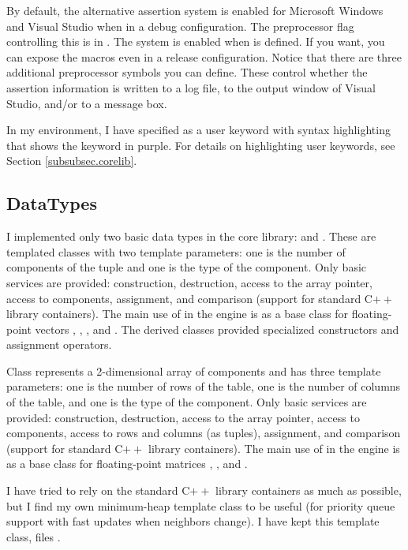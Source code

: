 \documentclass{article}
\begin{document}
By default, the alternative assertion system is enabled for Microsoft
Windows and Visual Studio when in a debug configuration.  The preprocessor
flag controlling this is in .  The system is enabled
when  is defined.  If you want, you can expose the
macros even in a release configuration.  Notice that there are three
additional preprocessor symbols you can define.  These control whether
the assertion information is written to a log file, to the output window
of Visual Studio, and/or to a message box.

In my environment, I have  specified as a user keyword
with syntax highlighting that shows the keyword in purple.  For details
on highlighting user keywords, see Section \ref{subsubsec.corelib}.

\subsection{DataTypes}

I implemented only two basic data types in the core library:  
and .  These are templated classes with two template
parameters: one is the number of components of the tuple and one is the
type of the component.  Only basic services are provided:  construction,
destruction, access to the array pointer, access to components, assignment,
and comparison (support for standard C$++$ library containers).  The main
use of  in the engine is as a base class for floating-point
vectors , , , and .
The derived classes provided specialized constructors and assignment
operators.

Class  represents a 2-dimensional array of components and has
three template parameters: one is the number of rows of the table, one is
the number of columns of the table, and one is the type of the component.
Only basic services are provided:  construction, destruction, access to
the array pointer, access to components, access to rows and columns (as
tuples), assignment, and comparison (support for standard C$++$ library
containers).  The main use of  in the engine is as a base
class for floating-point matrices , , and
.

I have tried to rely on the standard C$++$ library containers as much as
possible, but I find my own minimum-heap template class to be useful (for
priority queue support with fast updates when neighbors change).  I have
kept this template class, files .
\end{document}
